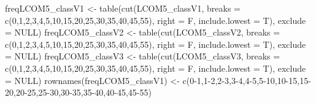 \documentclass[
]{article}
\newenvironment{Shaded}{\begin{snugshade}}{\end{snugshade}}
\newcommand{\AttributeTok}[1]{\textcolor[rgb]{0.77,0.63,0.00}{#1}}
\newcommand{\ConstantTok}[1]{\textcolor[rgb]{0.00,0.00,0.00}{#1}}
\newcommand{\DecValTok}[1]{\textcolor[rgb]{0.00,0.00,0.81}{#1}}
\newcommand{\FunctionTok}[1]{\textcolor[rgb]{0.00,0.00,0.00}{#1}}
\newcommand{\NormalTok}[1]{#1}
\newcommand{\OtherTok}[1]{\textcolor[rgb]{0.56,0.35,0.01}{#1}}
\newcommand{\StringTok}[1]{\textcolor[rgb]{0.31,0.60,0.02}{#1}}
\begin{document}
\begin{Shaded}
\begin{Highlighting}[]
\NormalTok{freqLCOM5\_classV1 }\OtherTok{\textless{}{-}} \FunctionTok{table}\NormalTok{(}\FunctionTok{cut}\NormalTok{(LCOM5\_classV1, }\AttributeTok{breaks =} \FunctionTok{c}\NormalTok{(}\DecValTok{0}\NormalTok{,}\DecValTok{1}\NormalTok{,}\DecValTok{2}\NormalTok{,}\DecValTok{3}\NormalTok{,}\DecValTok{4}\NormalTok{,}\DecValTok{5}\NormalTok{,}\DecValTok{10}\NormalTok{,}\DecValTok{15}\NormalTok{,}\DecValTok{20}\NormalTok{,}\DecValTok{25}\NormalTok{,}\DecValTok{30}\NormalTok{,}\DecValTok{35}\NormalTok{,}\DecValTok{40}\NormalTok{,}\DecValTok{45}\NormalTok{,}\DecValTok{55}\NormalTok{), }\AttributeTok{right =}\NormalTok{ F, }\AttributeTok{include.lowest =}\NormalTok{ T), }\AttributeTok{exclude =} \ConstantTok{NULL}\NormalTok{)}
\NormalTok{freqLCOM5\_classV2 }\OtherTok{\textless{}{-}} \FunctionTok{table}\NormalTok{(}\FunctionTok{cut}\NormalTok{(LCOM5\_classV2, }\AttributeTok{breaks =} \FunctionTok{c}\NormalTok{(}\DecValTok{0}\NormalTok{,}\DecValTok{1}\NormalTok{,}\DecValTok{2}\NormalTok{,}\DecValTok{3}\NormalTok{,}\DecValTok{4}\NormalTok{,}\DecValTok{5}\NormalTok{,}\DecValTok{10}\NormalTok{,}\DecValTok{15}\NormalTok{,}\DecValTok{20}\NormalTok{,}\DecValTok{25}\NormalTok{,}\DecValTok{30}\NormalTok{,}\DecValTok{35}\NormalTok{,}\DecValTok{40}\NormalTok{,}\DecValTok{45}\NormalTok{,}\DecValTok{55}\NormalTok{), }\AttributeTok{right =}\NormalTok{ F, }\AttributeTok{include.lowest =}\NormalTok{ T), }\AttributeTok{exclude =} \ConstantTok{NULL}\NormalTok{)}
\NormalTok{freqLCOM5\_classV3 }\OtherTok{\textless{}{-}} \FunctionTok{table}\NormalTok{(}\FunctionTok{cut}\NormalTok{(LCOM5\_classV3, }\AttributeTok{breaks =} \FunctionTok{c}\NormalTok{(}\DecValTok{0}\NormalTok{,}\DecValTok{1}\NormalTok{,}\DecValTok{2}\NormalTok{,}\DecValTok{3}\NormalTok{,}\DecValTok{4}\NormalTok{,}\DecValTok{5}\NormalTok{,}\DecValTok{10}\NormalTok{,}\DecValTok{15}\NormalTok{,}\DecValTok{20}\NormalTok{,}\DecValTok{25}\NormalTok{,}\DecValTok{30}\NormalTok{,}\DecValTok{35}\NormalTok{,}\DecValTok{40}\NormalTok{,}\DecValTok{45}\NormalTok{,}\DecValTok{55}\NormalTok{), }\AttributeTok{right =}\NormalTok{ F, }\AttributeTok{include.lowest =}\NormalTok{ T), }\AttributeTok{exclude =} \ConstantTok{NULL}\NormalTok{)}
\FunctionTok{rownames}\NormalTok{(freqLCOM5\_classV1) }\OtherTok{\textless{}{-}} \FunctionTok{c}\NormalTok{(}\StringTok{\textquotesingle{}0{-}1\textquotesingle{}}\NormalTok{,}\StringTok{\textquotesingle{}1{-}2\textquotesingle{}}\NormalTok{,}\StringTok{\textquotesingle{}2{-}3\textquotesingle{}}\NormalTok{,}\StringTok{\textquotesingle{}3{-}4\textquotesingle{}}\NormalTok{,}\StringTok{\textquotesingle{}4{-}5\textquotesingle{}}\NormalTok{,}\StringTok{\textquotesingle{}5{-}10\textquotesingle{}}\NormalTok{,}\StringTok{\textquotesingle{}10{-}15\textquotesingle{}}\NormalTok{,}\StringTok{\textquotesingle{}15{-}20\textquotesingle{}}\NormalTok{,}\StringTok{\textquotesingle{}20{-}25\textquotesingle{}}\NormalTok{,}\StringTok{\textquotesingle{}25{-}30\textquotesingle{}}\NormalTok{,}\StringTok{\textquotesingle{}30{-}35\textquotesingle{}}\NormalTok{,}\StringTok{\textquotesingle{}35{-}40\textquotesingle{}}\NormalTok{,}\StringTok{\textquotesingle{}40{-}45\textquotesingle{}}\NormalTok{,}\StringTok{\textquotesingle{}45{-}55\textquotesingle{}}\NormalTok{)}

\end{Highlighting}
\end{Shaded}
\end{document}
